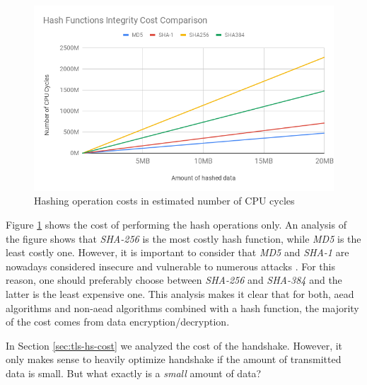 \begin{figure}
  \centering
  \includegraphics[width=1.0\textwidth]{img/hash-costs.png}
  \centering \caption{\label{fig:hash-cost} Hashing operation costs in estimated number of CPU cycles}
\end{figure}

Figure \ref{fig:hash-cost} shows the cost of performing the hash operations only. An analysis of the figure shows that \textit{SHA-256} is the most
costly hash function, while \textit{MD5} is the least costly one. However, it is important to consider that \textit{MD5} and \textit{SHA-1} are nowadays
considered insecure and vulnerable to numerous attacks \cite{turner2011updated} \cite{polk2011security}. For this reason, one should preferably choose between
\textit{SHA-256} and \textit{SHA-384} and the latter is the least expensive one.
This analysis makes it clear that for both, \gls{aead} algorithms and non-\gls{aead} algorithms combined with a hash function, the majority of the cost 
comes from data encryption/decryption.

In Section \ref{sec:tls-hs-cost} we analyzed the cost of the handshake. However, it only makes sense to heavily optimize handshake
if the amount of transmitted data is small. But what exactly is a \textit{small} amount of data?

